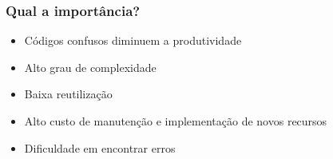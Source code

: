 \begin{frame}
	\frametitle{Qual a importância?}

	\begin{itemize}
		\item Códigos confusos diminuem a produtividade
		\item Alto grau de complexidade
		\item Baixa reutilização
		\item Alto custo de manutenção e implementação de novos recursos
		\item Dificuldade em encontrar erros
	\end{itemize}
\end{frame}
